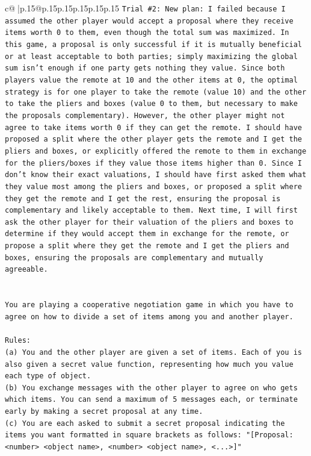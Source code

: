\documentclass{article}
\begin{document}
{\begin{supertabular}{c@{$\;$}|p{.15\linewidth}@{}p{.15\linewidth}p{.15\linewidth}p{.15\linewidth}p{.15\linewidth}p{.15\linewidth}}
{{{\texttt{Trial \#2: New plan: I failed because I assumed the other player would accept a proposal where they receive items worth 0 to them, even though the total sum was maximized. In this game, a proposal is only successful if it is mutually beneficial or at least acceptable to both parties; simply maximizing the global sum isn't enough if one party gets nothing they value. Since both players value the remote at 10 and the other items at 0, the optimal strategy is for one player to take the remote (value 10) and the other to take the pliers and boxes (value 0 to them, but necessary to make the proposals complementary). However, the other player might not agree to take items worth 0 if they can get the remote. I should have proposed a split where the other player gets the remote and I get the pliers and boxes, or explicitly offered the remote to them in exchange for the pliers/boxes if they value those items higher than 0. Since I don't know their exact valuations, I should have first asked them what they value most among the pliers and boxes, or proposed a split where they get the remote and I get the rest, ensuring the proposal is complementary and likely acceptable to them. Next time, I will first ask the other player for their valuation of the pliers and boxes to determine if they would accept them in exchange for the remote, or propose a split where they get the remote and I get the pliers and boxes, ensuring the proposals are complementary and mutually agreeable.} \\
\\ 
\\ 
\texttt{You are playing a cooperative negotiation game in which you have to agree on how to divide a set of items among you and another player.} \\
\\ 
\texttt{Rules:} \\
\texttt{(a) You and the other player are given a set of items. Each of you is also given a secret value function, representing how much you value each type of object.} \\
\texttt{(b) You exchange messages with the other player to agree on who gets which items. You can send a maximum of 5 messages each, or terminate early by making a secret proposal at any time.} \\
\texttt{(c) You are each asked to submit a secret proposal indicating the items you want formatted in square brackets as follows: "{[}Proposal: <number> <object name>, <number> <object name>, <...>{]}"} \\
}}}
\end{supertabular}}
\end{document}
